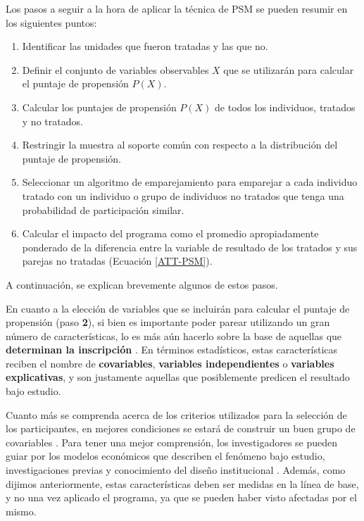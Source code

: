 \documentclass[../../main.tex]{subfiles}
\begin{document}
Los pasos a seguir a la hora de aplicar la técnica de PSM se pueden resumir en los
siguientes puntos:
\begin{enumerate}[label=\textbf{\arabic*.}]
    \item Identificar las unidades que fueron tratadas y las que no.
    \item Definir el conjunto de variables observables \(X\) que se utilizarán para
    calcular el puntaje de propensión \(P(X)\).
    \item Calcular los puntajes de propensión \(P(X)\) de todos los individuos, tratados y
    no tratados.
    \item Restringir la muestra al soporte común con respecto a la distribución
    del puntaje de propensión.
    \item Seleccionar un algoritmo de emparejamiento para emparejar a cada individuo
    tratado con un individuo o grupo de individuos no tratados que tenga una probabilidad
    de participación similar.
    \item Calcular el impacto del programa como el promedio apropiadamente ponderado de la
    diferencia entre la variable de resultado de los tratados y sus parejas no tratadas
    (Ecuación \ref{ATT-PSM}).
\end{enumerate}
A continuación, se explican brevemente algunos de estos pasos.

En cuanto a la elección de variables que se incluirán para calcular el puntaje de
propensión (paso \textbf{2}), si bien es importante poder parear utilizando un gran número
de características, lo es más aún hacerlo sobre la base de aquellas que \textbf{determinan
la inscripción} \cite{gertler-2016}. En términos estadísticos, estas características
reciben el nombre de \textbf{covariables}, \textbf{variables independientes} o
\textbf{variables explicativas}, y son justamente aquellas que posiblemente predicen el
resultado bajo estudio.

Cuanto más se comprenda acerca de los criterios utilizados para la selección de los
participantes, en mejores condiciones se estará de construir un buen grupo de covariables
\cite{gertler-2016}. Para tener una mejor comprensión, los investigadores se pueden guiar
por los modelos económicos que describen el fenómeno bajo estudio, investigaciones previas
y conocimiento del diseño institucional \cite{bernal}. Además, como dijimos anteriormente,
estas características deben ser medidas en la línea de base, y no una vez aplicado el
programa, ya que se pueden haber visto afectadas por el mismo.
\end{document}
